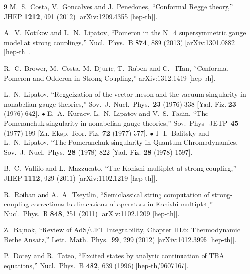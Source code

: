 \documentclass[a4paper,11pt]{article}
\numberwithin{equation}{section}
\begin{document}
\begin{thebibliography} {9}
  M.~S.~Costa, V.~Goncalves and J.~Penedones,
  ``Conformal Regge theory,''
  JHEP {\bf 1212}, 091 (2012)
  [arXiv:1209.4355 [hep-th]].

  A.~V.~Kotikov and L.~N.~Lipatov,
  ``Pomeron in the N=4 supersymmetric gauge model at strong couplings,''
  Nucl.\ Phys.\ B {\bf 874}, 889 (2013)
  [arXiv:1301.0882 [hep-th]].

  R.~C.~Brower, M.~Costa, M.~Djuric, T.~Raben and C.~-ITan,
  ``Conformal Pomeron and Odderon in Strong Coupling,''
  arXiv:1312.1419 [hep-ph].

  L.~N.~Lipatov, ``Reggeization of the vector meson and the vacuum singularity in nonabelian gauge theories,'' Sov.\ J.\ Nucl.\ Phys.\ {\bf 23} (1976) 338 [Yad. Fiz. {\bf 23} (1976) 642]. $\bullet$
  E.~A.~Kuraev, L.~N.~Lipatov and V.~S.~Fadin, ``The Pomeranchuk singularity in nonabelian gauge theories,'' Sov.\ Phys.\ JETP\ {\bf 45} (1977) 199 [Zh. Eksp. Teor. Fiz. {\bf 72} (1977) 377]. $\bullet$
  I.~I.~Balitsky and L.~N.~Lipatov, ``The Pomeranchuk singularity in Quantum Chromodynamics,\\ Sov.\ J.\ Nucl.\ Phys.\ {\bf 28} (1978) 822 [Yad. Fiz. {\bf 28} (1978) 1597].

  B.~C.~Vallilo and L.~Mazzucato,
  ``The Konishi multiplet at strong coupling,''
  JHEP {\bf 1112}, 029 (2011)
  [arXiv:1102.1219 [hep-th]].

  R.~Roiban and A.~A.~Tseytlin,
  ``Semiclassical string computation of strong-coupling corrections to dimensions of operators in Konishi multiplet,''
  Nucl.\ Phys.\ B {\bf 848}, 251 (2011)
  [arXiv:1102.1209 [hep-th]].

  Z.~Bajnok,
  ``Review of AdS/CFT Integrability, Chapter III.6: Thermodynamic Bethe Ansatz,''
  Lett.\ Math.\ Phys.\  {\bf 99}, 299 (2012)
  [arXiv:1012.3995 [hep-th]].

  P.~Dorey and R.~Tateo,
  ``Excited states by analytic continuation of TBA equations,''
  Nucl.\ Phys.\ B {\bf 482}, 639 (1996)
  [hep-th/9607167].


\end{thebibliography}
\end{document}
